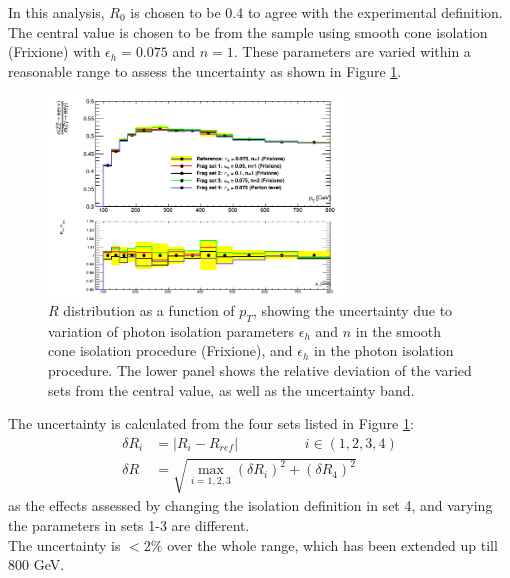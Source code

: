 \documentclass[11pt,a4paper]{report}
\begin{document}
In this analysis, $R_0$ is chosen to be 0.4 to agree with the experimental definition. The central value is chosen to be from the sample using smooth cone isolation (Frixione) with $\epsilon_h = 0.075$ and $n=1$. These parameters are varied within a reasonable range to assess the uncertainty as shown in Figure \ref{fig:photon_frag}.

\begin{figure}[H]
\centering
	\includegraphics[width=0.7\textwidth]{frag.png}
	\caption{$R$ distribution as a function of $p_T$, showing the uncertainty due to variation of photon isolation parameters $\epsilon_h$ and $n$ in the smooth cone isolation procedure (Frixione), and $\epsilon_h$ in the photon isolation procedure. The lower panel shows the relative deviation of the varied sets from the central value, as well as the uncertainty band.}
	\label{fig:photon_frag}
\end{figure}

The uncertainty is calculated from the four sets listed in Figure \ref{fig:photon_frag}:
\begin{equation}
\begin{split}
\delta R_i &= |R_i - R_{ref}| \hspace{2cm}  i \in (1,2,3,4)\\
\delta R &= \sqrt{\max_{i=1,2,3}(\delta R_i)^2 + (\delta R_4)^2}
\end{split}
\end{equation}
as the effects assessed by changing the isolation definition in set 4, and varying the parameters in sets 1-3 are different.\\
The uncertainty is $< 2\%$ over the whole range, which has been extended up till 800 GeV.
\end{document}
